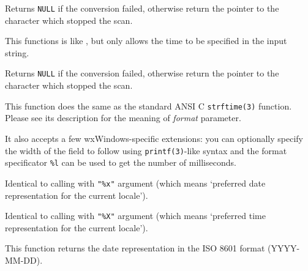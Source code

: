 Returns {\tt NULL} if the conversion failed, otherwise return the pointer to
the character which stopped the scan.

\label{wxdatetimeparsetime}


This functions is like , but
only allows the time to be specified in the input string.

Returns {\tt NULL} if the conversion failed, otherwise return the pointer to
the character which stopped the scan.

\label{wxdatetimeformat}


This function does the same as the standard ANSI C {\tt strftime(3)} function.
Please see its description for the meaning of {\it format} parameter.

It also accepts a few wxWindows-specific extensions: you can optionally specify
the width of the field to follow using {\tt printf(3)}-like syntax and the
format specificator {\tt \%l} can be used to get the number of milliseconds.



\label{wxdatetimeformatdate}


Identical to calling  with {\tt "\%x"}
argument (which means `preferred date representation for the current locale').

\label{wxdatetimeformattime}


Identical to calling  with {\tt "\%X"}
argument (which means `preferred time representation for the current locale').

\label{wxdatetimeformatisodate}


This function returns the date representation in the ISO 8601 format
(YYYY-MM-DD).

